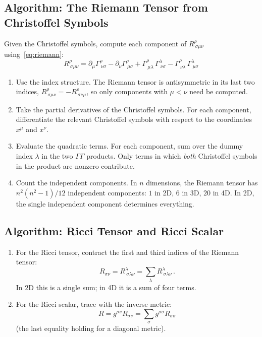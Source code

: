 \subsection{Algorithm: The Riemann Tensor from Christoffel Symbols}
\label{sec:dg_cookbook_riemann}

Given the Christoffel symbols, compute each component of
$R^\rho_{\ \sigma\mu\nu}$ using~\eqref{eq:riemann}:
\[
    R^\rho_{\ \sigma\mu\nu} = \partial_\mu \Gamma^\rho_{\ \nu\sigma}
    - \partial_\nu \Gamma^\rho_{\ \mu\sigma}
    + \Gamma^\rho_{\ \mu\lambda}\, \Gamma^\lambda_{\ \nu\sigma}
    - \Gamma^\rho_{\ \nu\lambda}\, \Gamma^\lambda_{\ \mu\sigma}
\]

\begin{enumerate}
    \item Use the index structure.
          The Riemann tensor is antisymmetric in its last two indices,
          $R^\rho_{\ \sigma\mu\nu} = -R^\rho_{\ \sigma\nu\mu}$,
          so only components with $\mu < \nu$ need be computed.

    \item Take the partial derivatives of the Christoffel symbols.
          For each component, differentiate the relevant Christoffel
          symbols with respect to the coordinates $x^\mu$ and $x^\nu$.

    \item Evaluate the quadratic terms.
          For each component, sum over the dummy index $\lambda$ in the
          two $\Gamma\Gamma$ products.  Only terms in which \emph{both}
          Christoffel symbols in the product are nonzero contribute.

    \item Count the independent components.
          In $n$ dimensions, the Riemann tensor has $n^2(n^2-1)/12$
          independent components: $1$ in 2D, $6$ in 3D, $20$ in 4D.
          In 2D, the single independent component determines everything.
\end{enumerate}

\subsection{Algorithm: Ricci Tensor and Ricci Scalar}
\label{sec:dg_cookbook_ricci}

\begin{enumerate}
    \item For the Ricci tensor, contract the first and third indices
          of the Riemann tensor:
          \[
              R_{\sigma\nu} = R^\lambda_{\ \sigma\lambda\nu}
              = \sum_{\lambda} R^\lambda_{\ \sigma\lambda\nu} \,.
          \]
          In 2D this is a single sum; in 4D it is a sum of four terms.

    \item For the Ricci scalar, trace with the inverse metric:
          \[
              R = g^{\sigma\nu} R_{\sigma\nu}
              = \sum_{\sigma} g^{\sigma\sigma} R_{\sigma\sigma}
          \]
          (the last equality holding for a diagonal metric).
\end{enumerate}

